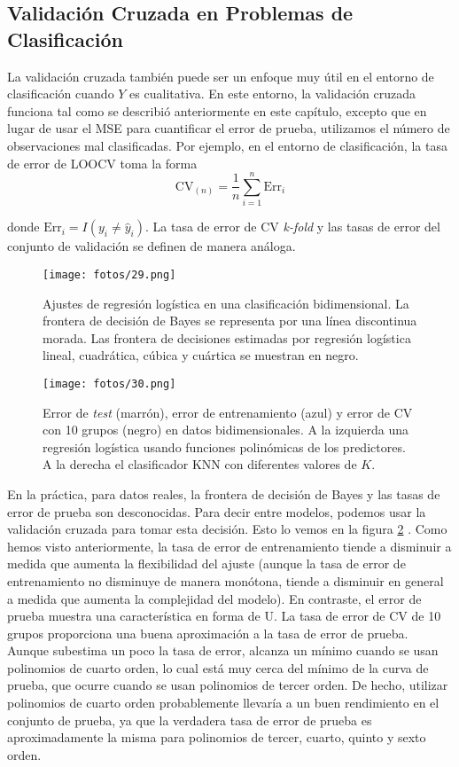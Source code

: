 \subsection{Validación Cruzada en Problemas de Clasificación}

La validación cruzada también puede ser un enfoque muy útil en el entorno de clasificación cuando $Y$ es cualitativa. En este entorno, la validación cruzada funciona tal como se describió anteriormente en este capítulo, excepto que en lugar de usar el MSE para cuantificar el error de prueba, utilizamos el número de observaciones mal clasificadas. Por ejemplo, en el entorno de clasificación, la tasa de error de LOOCV toma la forma
\begin{equation}
\text{CV}_{(n)} = \frac{1}{n} \sum_{i=1}^{n} \text{Err}_i
\end{equation}

donde $\text{Err}_i = I(y_i \neq \hat{y}_i)$. La tasa de error de CV \textit{k-fold} y las tasas de error del conjunto de validación se definen de manera análoga. \\

\begin{figure}[h]
\centering
\texttt{[image: fotos/29.png]}
\caption{Ajustes de regresión logística en una clasificación bidimensional. La frontera de decisión de Bayes se representa por una línea discontinua morada. Las frontera de decisiones estimadas por regresión logística lineal, cuadrática, cúbica y cuártica se muestran en negro.}
\label{fig:5.7}
\end{figure}

\begin{figure}[h]
\centering
\texttt{[image: fotos/30.png]}
\caption{Error de \textit{test} (marrón), error de entrenamiento (azul) y error de CV con 10 grupos (negro) en datos bidimensionales. A la izquierda una regresión logística usando funciones polinómicas de los predictores. A la derecha el clasificador KNN con diferentes valores de $K$.}
\label{fig:5.8}
\end{figure}

En la práctica, para datos reales, la frontera de decisión de Bayes y las tasas de error de prueba son desconocidas. Para decir entre modelos, podemos usar la validación cruzada para tomar esta decisión. Esto lo vemos en la figura \ref{fig:5.8} . Como hemos visto anteriormente, la tasa de error de entrenamiento tiende a disminuir a medida que aumenta la flexibilidad del ajuste (aunque la tasa de error de entrenamiento no disminuye de manera monótona, tiende a disminuir en general a medida que aumenta la complejidad del modelo). En contraste, el error de prueba muestra una característica en forma de U. La tasa de error de CV de 10 grupos proporciona una buena aproximación a la tasa de error de prueba. Aunque subestima un poco la tasa de error, alcanza un mínimo cuando se usan polinomios de cuarto orden, lo cual está muy cerca del mínimo de la curva de prueba, que ocurre cuando se usan polinomios de tercer orden. De hecho, utilizar polinomios de cuarto orden probablemente llevaría a un buen rendimiento en el conjunto de prueba, ya que la verdadera tasa de error de prueba es aproximadamente la misma para polinomios de tercer, cuarto, quinto y sexto orden. 

